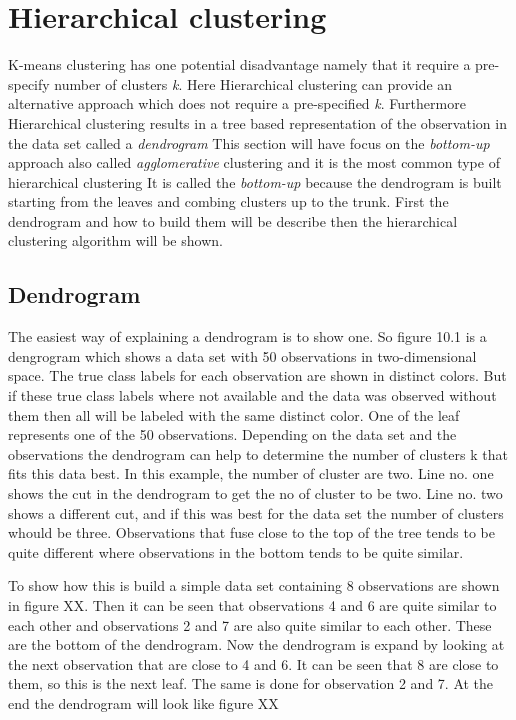 \chapter{Hierarchical clustering}
K-means clustering has one potential disadvantage namely that it require a pre-specify number of clusters \emph{k}. Here Hierarchical clustering can provide an alternative approach which does not require a pre-specified \emph{k}.
Furthermore Hierarchical clustering results in a tree based representation of the observation in the data set called a \emph{dendrogram}
This section will have focus on the \emph{bottom-up} approach also called \emph{agglomerative} clustering and it is the most common type of hierarchical clustering It is called the \emph{bottom-up} because the dendrogram is built starting from the leaves and combing clusters up to the trunk. 
First the dendrogram and how to build them will be describe then the hierarchical clustering algorithm will be shown.

\section{Dendrogram}
The easiest way of explaining a dendrogram is to show one. So figure 10.1 is a dengrogram which shows a data set with 50 observations in two-dimensional space.
The true class labels for each observation are shown in distinct colors. But if these true class labels where not available and the data was observed without them then all will be labeled with the same distinct color. 
One of the leaf represents one of the 50 observations. 
Depending on the data set and the observations the dendrogram can help to determine the number of clusters k that fits this data best. In this example, the number of cluster are two. Line no. one shows the cut in the dendrogram to get the no of cluster to be two. Line no. two shows a different cut, and if this was best for the data set the number of clusters whould be three.
Observations that fuse close to the top of the tree tends to be quite different where observations in the bottom tends to be quite similar. 


To show how this is build a simple data set containing 8 observations are shown in figure XX.
Then it can be seen that observations 4 and 6 are quite similar to each other and observations 2 and 7 are also quite similar to each other. These are the bottom of the dendrogram. Now the dendrogram is expand by looking at the next observation that are close to 4 and 6. It can be seen that 8 are close to them, so this is the next leaf. The same is done for observation 2 and 7. At the end the dendrogram will look like figure XX

